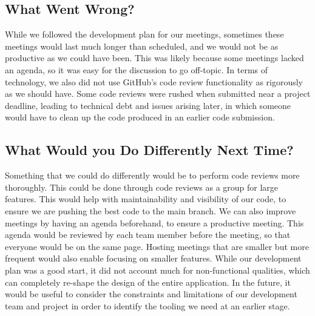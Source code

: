 \documentclass[12pt, titlepage]{article}
\begin{document}
\subsection{What Went Wrong?}

While we followed the development plan for our meetings, sometimes these meetings would last much longer than scheduled, and we would not be as productive as we could have been. This was likely because some meetings lacked an agenda, so it was easy for the discussion to go off-topic. In terms of technology, we also did not use GitHub's code review functionality as rigorously as we should have. Some code reviews were rushed when submitted near a project deadline, leading to technical debt and issues arising later, in which someone would have to clean up the code produced in an earlier code submission.

\subsection{What Would you Do Differently Next Time?}

Something that we could do differently would be to perform code reviews more thoroughly. This could be done through code reviews as a group for large features. This would help with maintainability and visibility of our code, to ensure we are pushing the best code to the main branch. We can also improve meetings by having an agenda beforehand, to ensure a productive meeting. This agenda would be reviewed by each team member before the meeting, so that everyone would be on the same page. Hosting meetings that are smaller but more frequent would also enable focusing on smaller features. While our development plan was a good start, it did not account much for non-functional qualities, which can completely re-shape the design of the entire application. In the future, it would be useful to consider the constraints and limitations of our development team and project in order to identify the tooling we need at an earlier stage.
\end{document}
